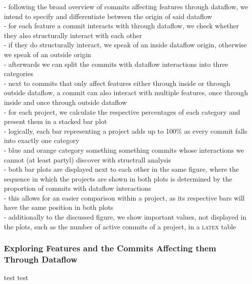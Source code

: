 - following the broad overview of commits affecting features through dataflow, we intend to specify and differentiate between the origin of said dataflow \\
- for each feature a commit interacts with through dataflow, we check whether they also structurally interact with each other \\
- if they do structurally interact, we speak of an inside dataflow origin, otherwise we speak of an outside origin \\
- afterwards we can split the commits with dataflow interactions into three categories \\
- next to commits that only affect features either through inside or through outside dataflow, a commit can also interact with multiple features, once through inside and once through outside dataflow \\
- for each project, we calculate the respective percentages of each category and present them in a stacked bar plot \\
- logically, each bar representing a project adds up to 100\% as every commit falls into exactly one category \\
- blue and orange category something something commits whose interactions we cannot (at least partyl) discover with structrall analysis \\
- both bar plots are displayed next to each other in the same figure, where the sequence in which the projects are shown in both plots is determined by the proportion of commits with dataflow interactions \\
- this allows for an easier comparison within a project, as its respective bars will have the same position in both plots \\
- additionally to the discussed figure, we show important values, not displayed in the plots, such as the number of active commits of a project, in a \textsc{latex} table \\

\subsubsection*{Exploring Features and the Commits Affecting them Through Dataflow}

test test
























